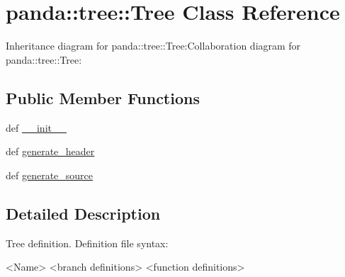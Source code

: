 \hypertarget{classpanda_1_1tree_1_1Tree}{
\section{panda::tree::Tree Class Reference}
\label{classpanda_1_1tree_1_1Tree}
}
Inheritance diagram for panda::tree::Tree:Collaboration diagram for panda::tree::Tree:\subsection*{Public Member Functions}
\begin{DoxyCompactItemize}
\item 
def \hyperlink{classpanda_1_1tree_1_1Tree_acc8d04b826b0ee03d596a6b5246920c9}{\_\-\_\-init\_\-\_\-}
\item 
def \hyperlink{classpanda_1_1tree_1_1Tree_ae3befaaeb4bbbba83cac85bdf740013d}{generate\_\-header}
\item 
def \hyperlink{classpanda_1_1tree_1_1Tree_a3a131456cf1be55058e137df7843e9d4}{generate\_\-source}
\end{DoxyCompactItemize}


\subsection{Detailed Description}
\begin{DoxyVerb}
Tree definition. Definition file syntax:

{<Name>}
<branch definitions>
<function definitions>
\end{DoxyVerb}
 

